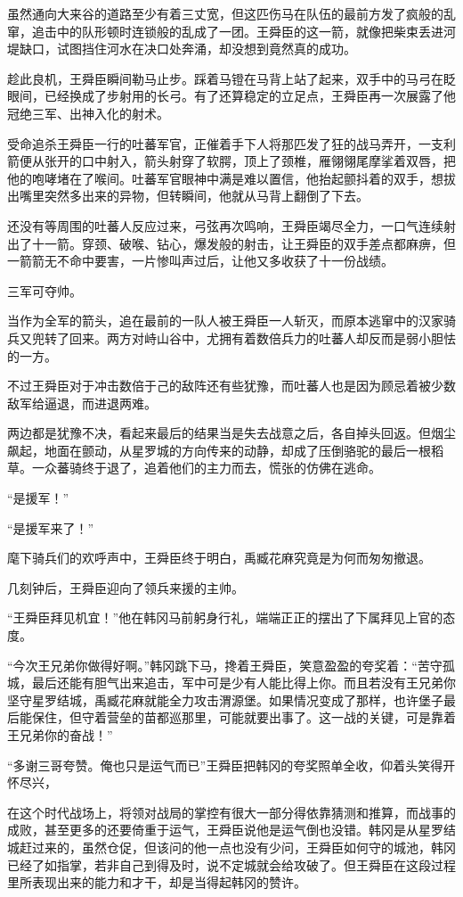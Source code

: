 虽然通向大来谷的道路至少有着三丈宽，但这匹伤马在队伍的最前方发了疯般的乱窜，追击中的队形顿时连锁般的乱成了一团。王舜臣的这一箭，就像把柴束丢进河堤缺口，试图挡住河水在决口处奔涌，却没想到竟然真的成功。

趁此良机，王舜臣瞬间勒马止步。踩着马镫在马背上站了起来，双手中的马弓在眨眼间，已经换成了步射用的长弓。有了还算稳定的立足点，王舜臣再一次展露了他冠绝三军、出神入化的射术。

受命追杀王舜臣一行的吐蕃军官，正催着手下人将那匹发了狂的战马弄开，一支利箭便从张开的口中射入，箭头射穿了软腭，顶上了颈椎，雁翎翎尾摩挲着双唇，把他的咆哮堵在了喉间。吐蕃军官眼神中满是难以置信，他抬起颤抖着的双手，想拔出嘴里突然多出来的异物，但转瞬间，他就从马背上翻倒了下去。

还没有等周围的吐蕃人反应过来，弓弦再次鸣响，王舜臣竭尽全力，一口气连续射出了十一箭。穿颈、破喉、钻心，爆发般的射击，让王舜臣的双手差点都麻痹，但一箭箭无不命中要害，一片惨叫声过后，让他又多收获了十一份战绩。

三军可夺帅。

当作为全军的箭头，追在最前的一队人被王舜臣一人斩灭，而原本逃窜中的汉家骑兵又兜转了回来。两方对峙山谷中，尤拥有着数倍兵力的吐蕃人却反而是弱小胆怯的一方。

不过王舜臣对于冲击数倍于己的敌阵还有些犹豫，而吐蕃人也是因为顾忌着被少数敌军给逼退，而进退两难。

两边都是犹豫不决，看起来最后的结果当是失去战意之后，各自掉头回返。但烟尘飙起，地面在颤动，从星罗城的方向传来的动静，却成了压倒骆驼的最后一根稻草。一众蕃骑终于退了，追着他们的主力而去，慌张的仿佛在逃命。

“是援军！”

“是援军来了！”

麾下骑兵们的欢呼声中，王舜臣终于明白，禹臧花麻究竟是为何而匆匆撤退。

几刻钟后，王舜臣迎向了领兵来援的主帅。

“王舜臣拜见机宜！”他在韩冈马前躬身行礼，端端正正的摆出了下属拜见上官的态度。

“今次王兄弟你做得好啊。”韩冈跳下马，搀着王舜臣，笑意盈盈的夸奖着：“苦守孤城，最后还能有胆气出来追击，军中可是少有人能比得上你。而且若没有王兄弟你坚守星罗结城，禹臧花麻就能全力攻击渭源堡。如果情况变成了那样，也许堡子最后能保住，但守着营垒的苗都巡那里，可能就要出事了。这一战的关键，可是靠着王兄弟你的奋战！”

“多谢三哥夸赞。俺也只是运气而已”王舜臣把韩冈的夸奖照单全收，仰着头笑得开怀尽兴，

在这个时代战场上，将领对战局的掌控有很大一部分得依靠猜测和推算，而战事的成败，甚至更多的还要倚重于运气，王舜臣说他是运气倒也没错。韩冈是从星罗结城赶过来的，虽然仓促，但该问的他一点也没有少问，王舜臣如何守的城池，韩冈已经了如指掌，若非自己到得及时，说不定城就会给攻破了。但王舜臣在这段过程里所表现出来的能力和才干，却是当得起韩冈的赞许。

